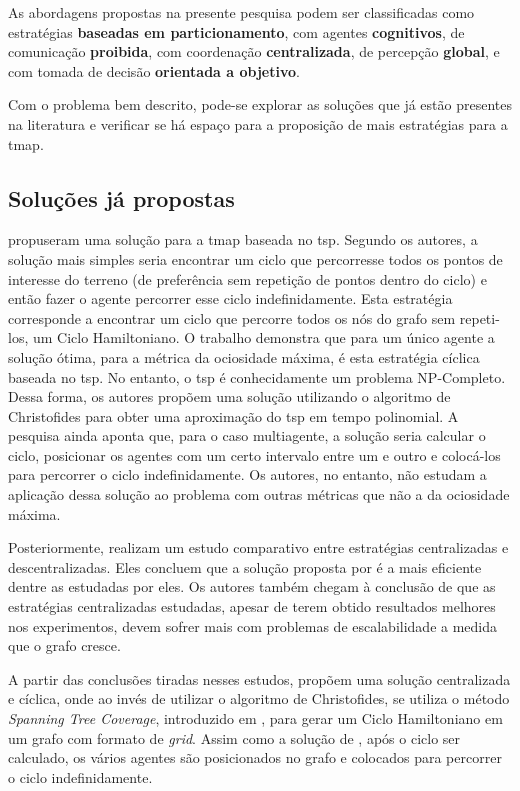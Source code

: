As abordagens propostas na presente pesquisa podem ser classificadas como 
estratégias \textbf{baseadas em particionamento}, com agentes 
\textbf{cognitivos}, de comunicação \textbf{proibida}, com coordenação 
\textbf{centralizada}, de percepção \textbf{global}, e com tomada de decisão 
\textbf{orientada a objetivo}.

Com o problema bem descrito, pode-se explorar as soluções que já estão presentes 
na literatura e verificar se há espaço para a proposição de mais estratégias 
para a \ac{tmap}.

\subsection{Soluções já propostas}

\citep{Chevaleyre:2004:TAM:1018411.1019013} propuseram uma solução para a 
\ac{tmap} baseada no \ac{tsp}. Segundo os autores, a solução mais simples seria 
encontrar um ciclo que percorresse todos os pontos de interesse do terreno 
(de preferência sem repetição de pontos dentro do ciclo) e então fazer o agente 
percorrer esse ciclo indefinidamente. Esta estratégia corresponde a encontrar um 
ciclo que percorre todos os nós do grafo sem repeti-los, um Ciclo Hamiltoniano. 
O trabalho demonstra que para um único agente a solução ótima, para a métrica da 
ociosidade máxima, é esta estratégia cíclica baseada no \ac{tsp}. No entanto, 
o \ac{tsp} é conhecidamente um problema NP-Completo. Dessa forma, os autores 
propõem uma solução utilizando o algoritmo de Christofides 
\citep{christofides1976worst} para obter uma aproximação do \ac{tsp} em tempo 
polinomial. A pesquisa ainda aponta que, para o caso multiagente, a solução 
seria calcular o ciclo, posicionar os agentes com um certo intervalo entre um e 
outro e colocá-los para percorrer o ciclo indefinidamente. Os autores, no 
entanto, não estudam a aplicação dessa solução ao problema com outras métricas 
que não a da ociosidade máxima.

Posteriormente, \citep{Almeida:2004:AAI} realizam um estudo comparativo entre 
estratégias centralizadas e descentralizadas. Eles concluem que a solução 
proposta por \citep{Chevaleyre:2004:TAM:1018411.1019013} é a mais eficiente 
dentre as estudadas por eles. Os autores também chegam à conclusão de que as 
estratégias centralizadas estudadas, apesar de terem obtido resultados melhores 
nos experimentos, devem sofrer mais com problemas de escalabilidade a medida 
que o grafo cresce.

A partir das conclusões tiradas nesses estudos, \citep{4209122} propõem uma 
solução centralizada e cíclica, onde ao invés de utilizar o algoritmo de 
Christofides, se utiliza o método \textit{Spanning Tree Coverage}, introduzido 
em \citep{Gabriely:2001}, para gerar um Ciclo Hamiltoniano em um grafo com 
formato de \textit{grid}. Assim como a solução de 
\citep{Chevaleyre:2004:TAM:1018411.1019013}, após o ciclo ser calculado, os 
vários agentes são posicionados no grafo e colocados para percorrer o ciclo 
indefinidamente.

